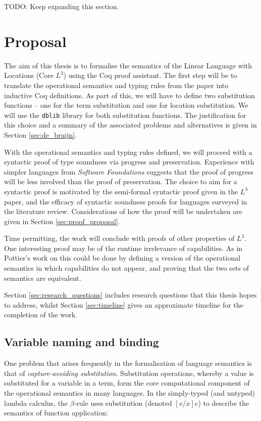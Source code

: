 \documentclass[]{unswthesis}
\newcommand{\SSPHS}{\text{SSPHS }}
\let\c\texttt
\begin{document}
TODO: Keep expanding this section.

\chapter{Proposal}
\label{ch:proposal}

The aim of this thesis is to formalise the semantics of the Linear Language with Locations (Core $L^3$) using the Coq proof assistant. The first step will be to translate the operational semantics and typing rules from the paper \cite{ahmed05} into inductive Coq definitions. As part of this, we will have to define two substitution functions -- one for the term substitution and one for location substitution. We will use the \c{dblib} library \cite{dblib13} for both substitution functions. The justification for this choice and a summary of the associated problems and alternatives is given in Section \ref{sec:de_bruijn}.

With the operational semantics and typing rules defined, we will proceed with a syntactic proof of type soundness via progress and preservation. Experience with simpler languages from \textit{Software Foundations} \cite{pierce15} suggests that the proof of progress will be less involved than the proof of preservation. The choice to aim for a syntactic proof is motivated by the semi-formal syntactic proof given in the $L^3$ paper, and the efficacy of syntactic soundness proofs for languages surveyed in the literature review. Considerations of how the proof will be undertaken are given in Section \ref{sec:proof_proposal}.

Time permitting, the work will conclude with proofs of other properties of $L^3$. One interesting proof may be of the runtime irrelevance of capabilities. As in Pottier's  work on \SSPHS \cite{pottier13} this could be done by defining a version of the operational semantics in which capabilities do not appear, and proving that the two sets of semantics are equivalent.

Section \ref{sec:research_questions} includes research questions that this thesis hopes to address, whilst Section \ref{sec:timeline} gives an approximate timeline for the completion of the work.

\section{Variable naming and binding}
\label{sec:var_naming}

One problem that arises frequently in the formalisation of language semantics is that of \textit{capture-avoiding substitution}. Substitution operations, whereby a value is substituted for a variable in a term, form the core computational component of the operational semantics in many languages. In the simply-typed (and untyped) lambda calculus, the $\beta$-rule uses substitution (denoted $[v/x]e$) to describe the semantics of function application:
\end{document}
